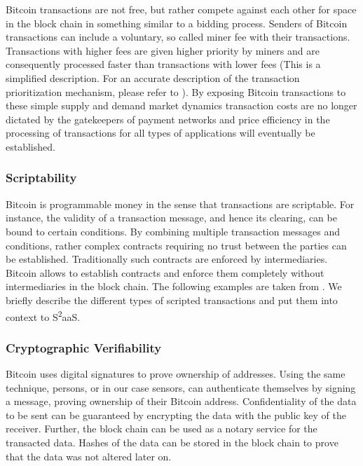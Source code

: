 Bitcoin transactions are not free, but rather compete against each other for space in the block chain in something similar to a bidding process. Senders of Bitcoin transactions can include a voluntary, so called miner fee with their transactions. Transactions with higher fees are given higher priority by miners and are consequently processed faster than transactions with lower fees (This is a simplified description. For an accurate description of the transaction prioritization mechanism, please refer to \parencite{bitcoinwiki, nakamoto2008bitcoin}). By exposing Bitcoin transactions to these simple supply and demand market dynamics transaction costs are no longer dictated by the gatekeepers of payment networks and price efficiency in the processing of transactions for all types of applications will eventually be established.

\subsubsection{Scriptability}
\label{subsec:script}

Bitcoin is programmable money in the sense that transactions are scriptable. For instance, the validity of a transaction message, and hence its clearing, can be bound to certain conditions. By combining multiple transaction messages and conditions, rather complex contracts requiring no trust between the parties can be established. Traditionally such contracts are enforced by intermediaries. Bitcoin allows to establish contracts and enforce them completely without intermediaries in the block chain. The following examples are taken from \cite{smartcontr}. We briefly describe the different types of scripted transactions and put them into context to S\textsuperscript{2}aaS.

\subsubsection{Cryptographic Verifiability}
Bitcoin uses digital signatures to prove ownership of addresses. Using the same technique, persons, or in our case sensors, can authenticate themselves by signing a message, proving ownership of their Bitcoin address. Confidentiality of the data to be sent can be guaranteed by encrypting the data with the public key of the receiver. Further, the block chain can be used as a notary service for the transacted data. Hashes of the data can be stored in the block chain to prove that the data was not altered later on.


